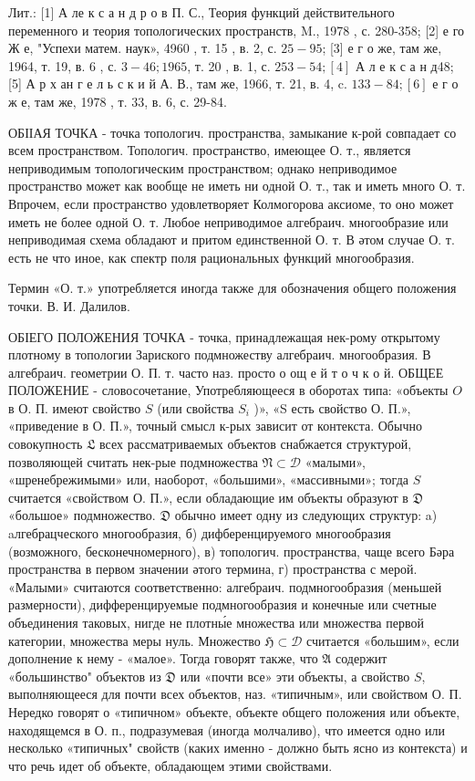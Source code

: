 \documentclass[10pt]{article}
\begin{document}
Лит.: [1] А ле к с а н д р о в П. С., Теория функций действительного переменного и теория топологических пространств, M., 1978 , с. 280-358; [2] е го Ж е, "Успехи матем. наук», 4960 , т. 15 , в. 2, с. $25-95$; [3] е г о же, там же, 1964, т. 19, в. 6 , с. $3-46 ; 1965$, т. 20 , в. 1, с. $253-54 ;[4]$ А л е к с а н д48; [5] А р х ан г е л ь с к и й А. В., там же, 1966, т. 21, в. 4, c. $133-84 ;[6]$ е г о ж е, там же, 1978 , т. 33, в. 6, с. 29-84.



ОБІІАЯ ТОЧКА - точка топологич. пространства, замыкание к-рой совпадает со всем пространством. Топологич. пространство, имеющее О. т., является неприводимым топологическим пространством; однако неприводимое пространство может как вообще не иметь ни одной О. т., так и иметь много О. т. Впрочем, если пространство удовлетворяет Колмогорова аксиоме, то оно может иметь не более одной О. т. Любое неприводимое алгебраич. многообразие или неприводимая схема обладают и притом единственной О. т. В әтом случае О. т. есть не что иное, как спектр поля рациональных функций многообразия.



Термин «О. т.» употребляется иногда также для обозначения общего положения точки. В. И. Далилов.



ОБІЕГО ПОЛОЖЕНИЯ ТОЧКА - точка, принадлежащая нек-рому открытому плотному в топологии Зариского подмножеству алгебраич. многообразия. В алгебраич. геометрии О. П. т. часто наз. просто о ощ е й т о ч к о й. ОБЩЕЕ ПОЛОЖЕНИЕ - словосочетание, Употребляющееся в оборотах типа: «объекты $O$ в О. П. имеют свойство $S$ (или свойства $S_{i}$ )», «S есть свойство О. П.», «приведение в О. П.», точный смысл к-рых зависит от контекста. Обычно совокупность $\mathfrak{L}$ всех рассматриваемых объектов снабжается структурой, позволяющей считать нек-рые подмножества $\mathfrak{N} \subset \mathcal{D}$ «малыми», «шренебрежимыми» или, наоборот, «большими», «массивными»; тогда $S$ считается «свойством О. П.», если обладающие им объекты образуют в $\mathfrak{D}$ «большое» подмножество. $\mathfrak{D}$ обычно имеет одну из следующих структур: a) aлгебрацческого многообразия, б) дифберенцируемого многообразия (возможного, бесконечномерного), в) топологич. пространства, чаще всего Бәра пространства в первом значении әтого термина, г) пространства с мерой. «Малыми» считаются соответственно: алгебраич. подмногообразия (меньшей размерности), дифференцируемые подмногообразия и конечные или счетные объединения таковых, нигде не плотны́е множества или множества первой категории, множества меры нуль. Множество $\mathfrak{H} \subset \mathcal{D}$ считается «большим», если дополнение к нему - «малое». Тогда говорят также, что $\mathfrak{A}$ содержит «большинство" объектов из $\mathfrak{D}$ или «почти все» эти объекты, а свойство $S$, выполняющееся для почти всех объектов, наз. «типичным», или свойством О. П. Нередко говорят о «типичном» объекте, объекте общего положения или объекте, находящемся в О. п., подразумевая (иногда молчаливо), что имеется одно или несколько «типичных" свойств (каких именно - должно быть ясно из контекста) и что речь идет об объекте, обладающем этими свойствами.
\end{document}
